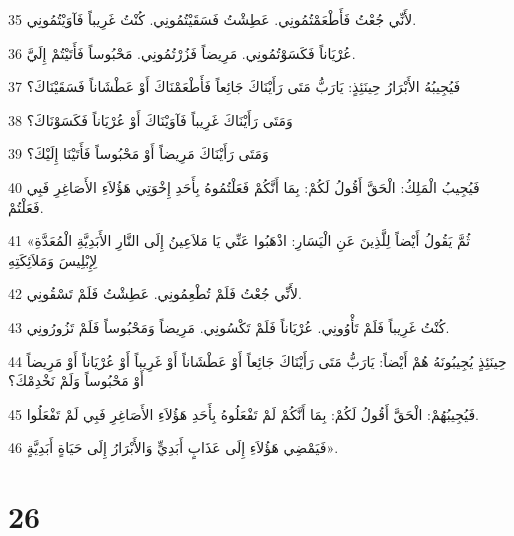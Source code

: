 \par 35 لأَنِّي جُعْتُ فَأَطْعَمْتُمُونِي. عَطِشْتُ فَسَقَيْتُمُونِي. كُنْتُ غَرِيباً فَآوَيْتُمُونِي.
\par 36 عُرْيَاناً فَكَسَوْتُمُونِي. مَرِيضاً فَزُرْتُمُونِي. مَحْبُوساً فَأَتَيْتُمْ إِلَيَّ.
\par 37 فَيُجِيبُهُ الأَبْرَارُ حِينَئِذٍ: يَارَبُّ مَتَى رَأَيْنَاكَ جَائِعاً فَأَطْعَمْنَاكَ أَوْ عَطْشَاناً فَسَقَيْنَاكَ؟
\par 38 وَمَتَى رَأَيْنَاكَ غَرِيباً فَآوَيْنَاكَ أَوْ عُرْيَاناً فَكَسَوْنَاكَ؟
\par 39 وَمَتَى رَأَيْنَاكَ مَرِيضاً أَوْ مَحْبُوساً فَأَتَيْنَا إِلَيْكَ؟
\par 40 فَيُجِيبُ الْمَلِكُ: الْحَقَّ أَقُولُ لَكُمْ: بِمَا أَنَّكُمْ فَعَلْتُمُوهُ بِأَحَدِ إِخْوَتِي هَؤُلاَءِ الأَصَاغِرِ فَبِي فَعَلْتُمْ.
\par 41 «ثُمَّ يَقُولُ أَيْضاً لِلَّذِينَ عَنِ الْيَسَارِ: اذْهَبُوا عَنِّي يَا مَلاَعِينُ إِلَى النَّارِ الأَبَدِيَّةِ الْمُعَدَّةِ لِإِبْلِيسَ وَمَلاَئِكَتِهِ
\par 42 لأَنِّي جُعْتُ فَلَمْ تُطْعِمُونِي. عَطِشْتُ فَلَمْ تَسْقُونِي.
\par 43 كُنْتُ غَرِيباً فَلَمْ تَأْوُونِي. عُرْيَاناً فَلَمْ تَكْسُونِي. مَرِيضاً وَمَحْبُوساً فَلَمْ تَزُورُونِي.
\par 44 حِينَئِذٍ يُجِيبُونَهُ هُمْ أَيْضاً: يَارَبُّ مَتَى رَأَيْنَاكَ جَائِعاً أَوْ عَطْشَاناً أَوْ غَرِيباً أَوْ عُرْيَاناً أَوْ مَرِيضاً أَوْ مَحْبُوساً وَلَمْ نَخْدِمْكَ؟
\par 45 فَيُجِيبُهُمْ: الْحَقَّ أَقُولُ لَكُمْ: بِمَا أَنَّكُمْ لَمْ تَفْعَلُوهُ بِأَحَدِ هَؤُلاَءِ الأَصَاغِرِ فَبِي لَمْ تَفْعَلُوا.
\par 46 فَيَمْضِي هَؤُلاَءِ إِلَى عَذَابٍ أَبَدِيٍّ وَالأَبْرَارُ إِلَى حَيَاةٍ أَبَدِيَّةٍ».

\chapter{26}

